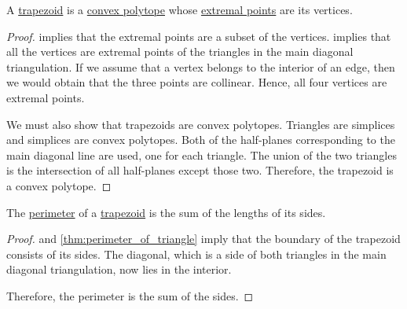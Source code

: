 \begin{proposition}\label{thm:trapezoid_is_polytope}
  A \hyperref[def:trapezoid]{trapezoid} is a \hyperref[def:convex_polytope]{convex polytope} whose \hyperref[def:extremal_point]{extremal points} are its vertices.
\end{proposition}
\begin{proof}
   implies that the extremal points are a subset of the vertices.  implies that all the vertices are extremal points of the triangles in the main diagonal triangulation. If we assume that a vertex belongs to the interior of an edge, then we would obtain that the three points are collinear. Hence, all four vertices are extremal points.

  We must also show that trapezoids are convex polytopes. Triangles are simplices and simplices are convex polytopes. Both of the half-planes corresponding to the main diagonal line are used, one for each triangle. The union of the two triangles is the intersection of all half-planes except those two. Therefore, the trapezoid is a convex polytope.
\end{proof}

\begin{proposition}\label{thm:perimeter_of_trapezoid}
  The \hyperref[def:perimeter]{perimeter} of a \hyperref[def:trapezoid]{trapezoid} is the sum of the lengths of its sides.
\end{proposition}
\begin{proof}
   and \cref{thm:perimeter_of_triangle} imply that the boundary of the trapezoid consists of its sides. The diagonal, which is a side of both triangles in the main diagonal triangulation, now lies in the interior.

  Therefore, the perimeter is the sum of the sides.
\end{proof}

